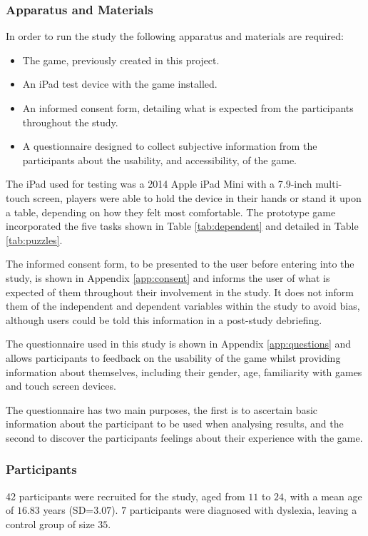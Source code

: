 \documentclass[journal]{IEEEtran}
\begin{document}
\subsubsection{Apparatus and Materials}
In order to run the study the following apparatus and materials are required:
\begin{itemize}[noitemsep]
\item The game, previously created in this project.
\item An iPad test device with the game installed.
\item An informed consent form, detailing what is expected from the participants throughout the study.
\item A questionnaire designed to collect subjective information from the participants about the usability, and accessibility, of the game.
\end{itemize}
The iPad used for testing was a 2014 Apple iPad Mini with a 7.9-inch multi-touch screen, players were able to hold the device in their hands or stand it upon a table, depending on how they felt most comfortable. The prototype game incorporated the five tasks shown in Table \ref{tab:dependent} and detailed in Table \ref{tab:puzzles}.

The informed consent form, to be presented to the user before entering into the study, is shown in Appendix \ref{app:consent} and informs the user of what is expected of them throughout their involvement in the study. It does not inform them of the independent and dependent variables within the study to avoid bias, although users could be told this information in a post-study debriefing.

The questionnaire used in this study is shown in Appendix \ref{app:questions} and allows participants to feedback on the usability of the game whilst providing information about themselves, including their gender, age, familiarity with games and touch screen devices.

The questionnaire has two main purposes, the first is to ascertain basic information about the participant to be used when analysing results, and the second to discover the participants feelings about their experience with the game.

\subsubsection{Participants}
42 participants were recruited for the study, aged from $11$ to $24$, with a mean age of $16.83$ years (SD=$3.07$). $7$ participants were diagnosed with dyslexia, leaving a control group of size $35$. 
\end{document}
